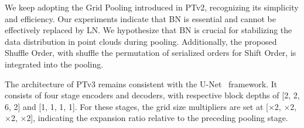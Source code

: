 We keep adopting the Grid Pooling introduced in PTv2, recognizing its simplicity and efficiency. Our experiments indicate that BN is essential and cannot be effectively replaced by LN. We hypothesize that BN is crucial for stabilizing the data distribution in point clouds during pooling. Additionally, the proposed Shuffle Order, with shuffle the permutation of serialized orders for Shift Order, is integrated into the pooling.

The architecture of PTv3 remains consistent with the U-Net~\cite{ronneberger2015unet} framework. It consists of four stage encoders and decoders, with respective block depths of [2, 2, 6, 2] and [1, 1, 1, 1]. For these stages, the grid size multipliers are set at [$\times$2, $\times$2, $\times$2, $\times$2], indicating the expansion ratio relative to the preceding pooling stage.